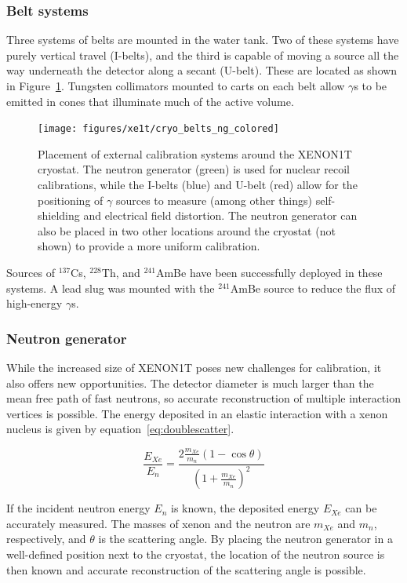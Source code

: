 \subsubsection{Belt systems}

Three systems of belts are mounted in the water tank. Two of these systems have purely vertical travel (I-belts), and the third is capable of moving a source all the way underneath the detector along a secant (U-belt). These are located as shown in Figure~\ref{fig:belts}. Tungsten collimators mounted to carts on each belt allow $\gamma$s to be emitted in cones that illuminate much of the active volume.

\begin{figure}[htb]
\centering
    \texttt{[image: figures/xe1t/cryo\_belts\_ng\_colored]}
    \caption{Placement of external calibration systems around the XENON1T cryostat. The neutron generator (green) is used for nuclear recoil calibrations, while the I-belts (blue) and U-belt (red) allow for the positioning of $\gamma$ sources to measure (among other things) self-shielding and electrical field distortion. The neutron generator can also be placed in two other locations around the cryostat (not shown) to provide a more uniform calibration.}\label{fig:belts}
\end{figure}

Sources of $^{137}$Cs, $^{228}$Th, and $^{241}$AmBe have been successfully deployed in these systems. A lead slug was mounted with the $^{241}$AmBe source to reduce the flux of high-energy $\gamma$s.

\subsubsection{Neutron generator}

While the increased size of XENON1T poses new challenges for calibration, it also offers new opportunities. The detector diameter is much larger than the mean free path of fast neutrons, so accurate reconstruction of multiple interaction vertices is possible. The energy deposited in an elastic interaction with a xenon nucleus is given by equation~\eqref{eq:doublescatter}.

\begin{equation}
\frac{E_{Xe}}{E_n} = \frac{2\frac{m_{Xe}}{m_n}(1-\cos\theta)}{\left(1+\frac{m_{Xe}}{m_n}\right)^2}
\label{eq:doublescatter}
\end{equation}

If the incident neutron energy $E_n$ is known, the deposited energy $E_{Xe}$ can be accurately measured. The masses of xenon and the neutron are $m_{Xe}$ and $m_n$, respectively, and $\theta$ is the scattering angle. By placing the neutron generator in a well-defined position next to the cryostat, the location of the neutron source is then known and accurate reconstruction of the scattering angle is possible.

